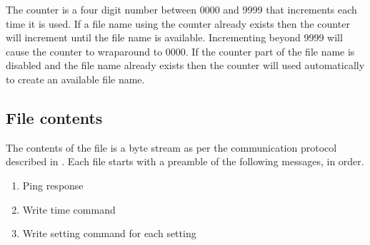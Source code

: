 The counter is a four digit number between 0000 and 9999 that increments each time it is used.  If a file name using the counter already exists then the counter will increment until the file name is available.  Incrementing beyond 9999 will cause the counter to wraparound to 0000.  If the counter part of the file name is disabled and the file name already exists then the counter will used automatically to create an available file name.

\subsection{File contents}

The contents of the file is a byte stream as per the communication protocol described in .  Each file starts with a preamble of the following messages, in order.

\begin{enumerate}[nolistsep]
    \item Ping response
    \item Write time command
    \item Write setting command for each setting
\end{enumerate}
